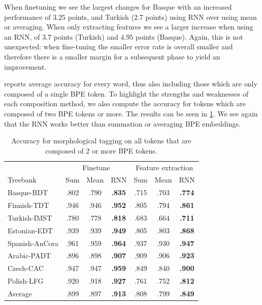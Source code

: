 \documentclass[11pt]{article}
\newcommand\jp[1]{(\textbf{JP:} #1)}
\begin{document}

        When finetuning we see the largest changes for Basque with an
        increased performance of $3.25$ points, and Turkish ($2.7$
        points) using RNN over using mean or averaging. When only
        extracting features we see a larger increase when using an
        RNN, of $3.7$ points (Turkish) and $4.95$ points
        (Basque). Again, this is not unexpected: when fine-tuning the
        smaller error rate is overall smaller and therefore there is a
        smaller margin for a subsequent phase to yield an improvement.

     reports average accuracy for every word,
    thus also including those which are only composed of a single BPE
    token. To highlight the strengths and weaknesses of each
    composition method, we also compute the accuracy for tokens which
    are composed of two BPE tokens or more. The results can be seen in
    \cref{tab:results_large_tokens}.  We see again that the RNN works
    better than summation or averaging BPE embeddings.
    
	\begin{table}%
	\centering
	\begin{tabular}{l|ccc|ccc}
		 & \multicolumn{3}{c}{Finetune} & \multicolumn{3}{c}{Feature extraction} \\
		Treebank & Sum & Mean & RNN & Sum & Mean & RNN  \\
		 \hline
        Basque-BDT      & .802 & .790 & \textbf{.835} & .715 & .703 & \textbf{.774} \\
		Finnish-TDT     & .946 & .946 & \textbf{.952} & .805 & .794 & \textbf{.861} \\ 
		Turkish-IMST    & .780 & .778 & \textbf{.818} & .683 & .664 & \textbf{.711} \\
		Estonian-EDT    & .939 & .939 & \textbf{.949} & .805 & .803 & \textbf{.868} \\
		Spanish-AnCora  & .961 & .959 & \textbf{.964} & .937 & .930 & \textbf{.947} \\
		Arabic-PADT     & .896 & .898 & \textbf{.907} & .909 & .906 & \textbf{.923}\\
		Czech-CAC       & .947 & .947 & \textbf{.959} & .849 & .840 & \textbf{.900} \\
		Polish-LFG      & .920 & .918 & \textbf{.927} & .761 & .752 & \textbf{.812} \\
        \hline
        Average         & .899 & .897 & \textbf{.913} & .808 & .799 & \textbf{.849} \\
	\end{tabular}
    	\caption{\label{tab:results_large_tokens} Accuracy for
     morphological tagging on all tokens that are composed of 2 or
     more BPE tokens.}
\end{table}
\end{document}

